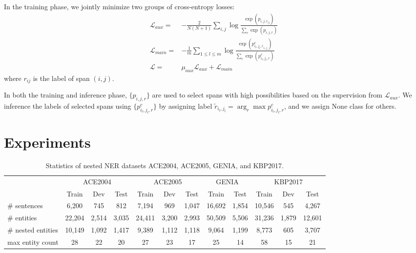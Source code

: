 \documentclass[11pt]{article}
\begin{document}
In the training phase, we jointly minimize two groups of cross-entropy losses:
\begin{align}
     \mathcal L_{aux} =& -\frac{2}{N(N+1)}\sum_{i,j} \log \frac{\exp(p_{i,j,r_{ij}})}{\sum_r\exp(p_{i,j,r})} \\
\mathcal L_{main} =& -\frac{1}{m}\sum_{1 \leq l \leq m} \log \frac{\exp(p^c_{i_l,j_l,r_{i_l,j_l}})}{\sum_r\exp(p^c_{i_l,j_l,r})} \\
\mathcal L =& \mu_{aux}\mathcal L_{aux} + \mathcal L_{main}
\end{align}
where $r_{ij}$ is the label of span $(i,j)$.

In both the training and inference phase, $\{p_{i,j,r}\}$ are used to select spans with high possibilities based on the supervision from $\mathcal L_{aux}$.
We inference the labels of selected spans using $\{p^{c}_{i_l,j_l,r}\}$ by assigning label $\tilde{r}_{i_l,j_l}=\arg_r\max p^{c}_{i_l,j_l,r}$, and we assign None class for others.

\section{Experiments}

\begin{table*}[t]
    \small 
    \centering
    \begin{tabular}{lccccccccccc}
    \toprule
       & \multicolumn{3}{c}{ACE2004} & \multicolumn{3}{c}{ACE2005} & \multicolumn{2}{c}{GENIA} & \multicolumn{3}{c}{KBP2017} \\
       & Train & Dev & Test & Train & Dev & Test & Train & Test & Train & Dev & Test \\
    \midrule
    $\#$ sentences & 6,200 & 745 & 812 & 7,194 & 969 & 1,047 & 16,692 & 1,854 & 10,546 & 545 & 4,267\\
$\#$ entities & 22,204 & 2,514 & 3,035 & 24,411 & 3,200 & 2,993 & 50,509 & 5,506 & 31,236 & 1,879 & 12,601 \\
    $\#$ nested entities & 10,149 & 1,092 & 1,417 & 9,389 & 1,112 & 1,118 & 9,064 & 1,199 & 8,773 & 605 & 3,707 \\
max entity count & 28 & 22 & 20 & 27 & 23 & 17 & 25 & 14 & 58 & 15 & 21 \\
    \bottomrule
    \end{tabular}
    \caption{Statistics of nested NER datasets ACE2004, ACE2005, GENIA, and KBP2017.}
    \label{dataset}
\end{table*}
\end{document}
